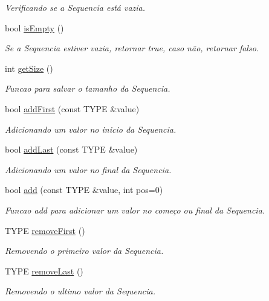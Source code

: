 \begin{DoxyCompactItemize}
\begin{DoxyCompactList}\small\item\em Verificando se a Sequencia está vazia. \end{DoxyCompactList}\item 
bool \hyperlink{classSequence_a6418341e58be9f5d8303266521f5b4d3}{is\+Empty} ()
\begin{DoxyCompactList}\small\item\em Se a Sequencia estiver vazia, retornar true, caso não, retornar falso. \end{DoxyCompactList}\item 
int \hyperlink{classSequence_aa10151201b866f031d800519c94b1f60}{get\+Size} ()
\begin{DoxyCompactList}\small\item\em Funcao para salvar o tamanho da Sequencia. \end{DoxyCompactList}\item 
bool \hyperlink{classSequence_a4cc033f7279c21353908bc322985450d}{add\+First} (const T\+Y\+P\+E \&value)
\begin{DoxyCompactList}\small\item\em Adicionando um valor no inicio da Sequencia. \end{DoxyCompactList}\item 
bool \hyperlink{classSequence_aba18baeedbc81a9b24c9331b4ee78881}{add\+Last} (const T\+Y\+P\+E \&value)
\begin{DoxyCompactList}\small\item\em Adicionando um valor no final da Sequencia. \end{DoxyCompactList}\item 
bool \hyperlink{classSequence_a5c9bdbf02bea5ef4552c127f8bc40bda}{add} (const T\+Y\+P\+E \&value, int pos=0)
\begin{DoxyCompactList}\small\item\em Funcao add para adicionar um valor no começo ou final da Sequencia. \end{DoxyCompactList}\item 
T\+Y\+P\+E \hyperlink{classSequence_a6c2f27cca357a3f494e7f05209f11afc}{remove\+First} ()
\begin{DoxyCompactList}\small\item\em Removendo o primeiro valor da Sequencia. \end{DoxyCompactList}\item 
T\+Y\+P\+E \hyperlink{classSequence_a5325f9adedf34e7bbbae9a5241b167b0}{remove\+Last} ()
\begin{DoxyCompactList}\small\item\em Removendo o ultimo valor da Sequencia. \end{DoxyCompactList}\item 

\end{DoxyCompactItemize}
